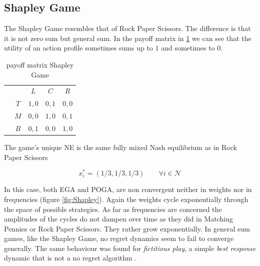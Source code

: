 \subsection{Shapley Game}\label{subsection:shapleyGame}

The Shapley Game resembles that of Rock Paper Scissors. The difference is that it is not zero sum but general sum. In the payoff matrix in \ref{tab:payoffShapley} we can see that the utility of an action profile sometimes sums up to $1$ and sometimes to $0$. 

\begin{table}[H]\centering
\setlength{\extrarowheight}{2pt}
\begin{tabular}{cc|c|c|c|}
  & \multicolumn{1}{c}{} & \multicolumn{1}{c}{$L$}  & \multicolumn{1}{c}{$C$}  & \multicolumn{1}{c}{$R$} \\\cline{3-5}
            & $T$ & $1,0$ & $0,1$ & $0,0$ \\ \cline{3-5}
            & $M$ & $0,0$ & $1,0$ & $0,1$ \\\cline{3-5}
            & $B$ & $0,1$ & $0,0$ & $1,0$ \\\cline{3-5}
\end{tabular}\caption{\label{tab:payoffShapley}payoff matrix Shapley Game}
\end{table}

The game's unique NE is the same fully mixed Nash equilibrium as in Rock Paper Scissors

\begin{equation*}
    x_{i}^{*} = (1/3,1/3,1/3) \qquad \forall i \in \mathcal{N}
\end{equation*}

In this case, both EGA and POGA, are non convergent neither in weights nor in frequencies (figure \ref{fig:Shapley}). Again the weights cycle exponentially through the space of possible strategies. As far as frequencies are concerned the amplitudes of the cycles do not dampen over time as they did in Matching Pennies or Rock Paper Scissors. They rather grow exponentially. In general sum games, like the Shapley Game, no regret dynamics  seem to fail to converge generally. The same behaviour was found for \textit{fictitious play}, a simple \textit{best response} dynamic that is not a no regret algorithm \cite{jafari}.


